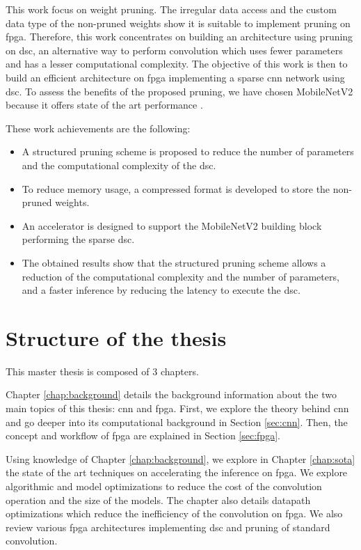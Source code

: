 This work focus on weight pruning. The irregular data access and the custom data type of the non-pruned weights show it is suitable to implement pruning on \acrshort{fpga}. Therefore, this work concentrates on building an architecture using pruning on \acrfull{dsc}, an alternative way to perform convolution which uses fewer parameters and has a lesser computational complexity. The objective of this work is then to build an efficient architecture on \acrshort{fpga} implementing a sparse \acrshort{cnn} network using \acrshort{dsc}. To assess the benefits of the proposed pruning, we have chosen MobileNetV2 because it offers state of the art performance \cite{sandler_mobilenetv2_2018}.

These work achievements are the following:
%
\begin{itemize}
    \item A structured pruning scheme is proposed to reduce the number of parameters and the computational complexity of the \acrshort{dsc}.
    \item To reduce memory usage, a compressed format is developed to store the non-pruned weights.
    \item An accelerator is designed to support the MobileNetV2 building block performing the sparse \acrshort{dsc}.
    \item The obtained results show that the structured pruning scheme allows a reduction of the computational complexity and the number of parameters, and a faster inference by reducing the latency to execute the \acrshort{dsc}.
\end{itemize}
%
%
\section*{Structure of the thesis}
%
%
This master thesis is composed of 3 chapters.

Chapter \ref{chap:background} details the background information about the two main topics of this thesis: \acrshort{cnn} and \acrshort{fpga}. First, we explore the theory behind \acrshort{cnn} and go deeper into its computational background in Section \ref{sec:cnn}. Then, the concept and workflow of \acrshort{fpga} are explained in Section \ref{sec:fpga}.

Using knowledge of Chapter \ref{chap:background}, we explore in Chapter \ref{chap:sota} the state of the art techniques on accelerating the inference on \acrshort{fpga}. We explore algorithmic and model optimizations to reduce the cost of the convolution operation and the size of the models. The chapter also details datapath optimizations which reduce the inefficiency of the convolution on \acrshort{fpga}. We also review various \acrshort{fpga} architectures implementing \acrshort{dsc} and pruning of standard convolution.

